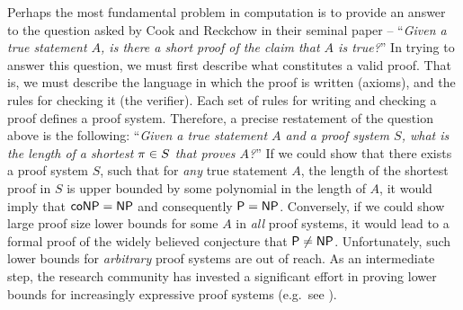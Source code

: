 \documentclass[11pt]{article}
\begin{document}
Perhaps the most fundamental problem in computation is to provide an answer to the question asked by Cook and Reckchow in their seminal paper \citep{cook1979relative} -- ``\textit{Given a true statement $A$, is there a short proof of the claim that $A$ is true?}''
In trying to answer this question, we must first describe what constitutes a valid proof. That is, we must describe the language in which the proof is written (axioms), and the rules for checking it (the verifier).
Each set of rules for writing and checking a proof defines a proof system.
Therefore, a precise restatement of the question above is the following:  ``\textit{Given a true statement $A$ and a proof system $S$, what is the length of a shortest $\pi \in S$ that proves $A$?}''
If we could show that there exists a proof system $S$, such that for \emph{any} true statement $A$, the length of the shortest proof in $S$ is upper bounded by some polynomial in the length of $A$, it would imply that $\mathsf{coNP} = \mathsf{NP}$ and consequently $\mathsf{P} = \mathsf{NP}$. 
Conversely, if we could show large proof size lower bounds for some $A$ in \emph{all} proof systems, it would lead to a formal proof of the widely believed conjecture that $\mathsf{P} \neq \mathsf{NP}$.
Unfortunately, such lower  bounds for \emph{arbitrary} proof systems are out of reach.
As an intermediate step,
the research community has invested a significant effort in proving lower bounds for increasingly expressive proof systems (e.g.\ see \citep{abascal2021strongly, alekhnovich2001lower, atserias2020Size, buss1999linear,  conneryd2023graph, de2023clique, impagliazzo1999lower,  kothari2017SumOfSquares, potechin:LIPIcs.CCC.2020.38, raz2008elusive, razborov1998lower, schoenebeck2008linear}). \par
\end{document}
